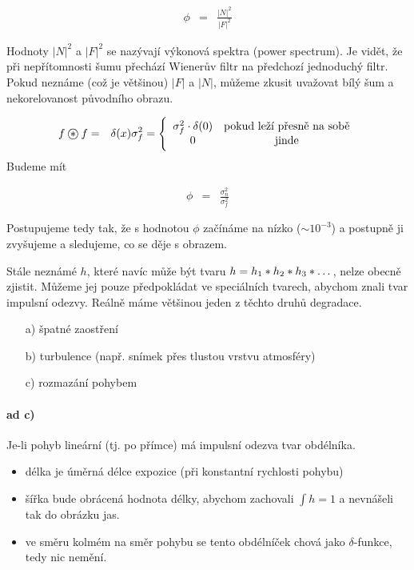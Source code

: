 \begin{eqnarray}
\phi&=&\frac{|N|^2}{|F|^2}
\end{eqnarray}

Hodnoty $|N|^2$ a $|F|^2$ se nazývají výkonová spektra (power spectrum). Je vidět, že při nepřítomnosti šumu 
přechází Wienerův filtr na předchozí jednoduchý filtr. Pokud neznáme (což je většinou) $|F|$ a $|N|$, můžeme zkusit
uvažovat bílý šum a nekorelovanost původního obrazu.

\begin{eqnarray}
 f\corr f&=&\delta(x)\sigma_f^2=\left\{\begin{array}{cc}\sigma_f^2\cdot\delta(0)&\hbox{pokud leží přesně na sobě}\\0&\hbox{jinde}\end{array}\right.
\end{eqnarray}
Budeme mít

\begin{eqnarray}
\phi&=&\frac{\sigma_n^2}{\sigma_f^2}
\end{eqnarray}

Postupujeme tedy tak, že s hodnotou $\phi$ začínáme na nízko ($\sim 10^{-3}$) a postupně ji zvyšujeme a sledujeme, co se 
děje s obrazem. 

Stále neznámé $h$, které navíc může být tvaru $h=h_1\ast h_2\ast h_3 \ast \dots$, nelze obecně zjistit. Můžeme jej
pouze předpokládat ve speciálních tvarech, abychom znali tvar impulsní odezvy. Reálně máme většinou jeden z těchto druhů degradace.

\begin{itemize}
\item[a)] špatné zaostření
\item[b)] turbulence (např. snímek přes tlustou vrstvu atmosféry)
\item[c)] rozmazání pohybem
\end{itemize}

\paragraph{ad c)} Je-li pohyb lineární (tj. po přímce) má impulsní odezva tvar obdélníka. 
\begin{itemize}
\item délka je úměrná délce expozice (při konstantní rychlosti pohybu)
\item šířka bude obrácená hodnota délky, abychom zachovali $\int h=1$ a nevnášeli tak do obrázku
jas. 
\item ve směru kolmém na směr pohybu se tento obdélníček chová jako $\delta$-funkce, tedy nic nemění. 
\end{itemize}

